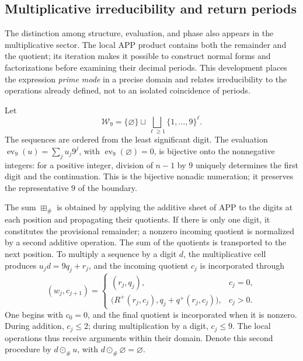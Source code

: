 \subsection{Multiplicative irreducibility and return periods}
\label{primos-retornos}

The distinction among structure, evaluation, and phase also appears in the
multiplicative sector. The local APP product contains both the remainder
and the quotient; its iteration makes it possible to construct normal forms
and factorizations before examining their decimal periods. This development
places the expression \emph{prime mode} in a precise domain and relates
irreducibility to the operations already defined, not to an isolated
coincidence of periods.

Let
\[
 \mathcal W_9=\{\varnothing\}\sqcup
 \bigsqcup_{\ell\geq1}\{1,\ldots,9\}^{\ell}.
\]
The sequences are ordered from the least significant digit. The evaluation
\(\operatorname{ev}_9(u)=\sum_j u_j9^j\), with
\(\operatorname{ev}_9(\varnothing)=0\), is bijective onto the nonnegative
integers: for a positive integer, division of \(n-1\) by \(9\)
uniquely determines the first digit and the continuation. This is the
bijective nonadic numeration; it preserves the representative \(9\) of the
boundary.

The sum \(\boxplus_\#\) is obtained by applying the additive sheet of APP to
the digits at each position and propagating their quotients. If there is only
one digit, it constitutes the provisional remainder; a nonzero incoming
quotient is normalized by a second additive operation. The sum of the
quotients is transported to the next position. To multiply a sequence by a
digit \(d\), the multiplicative cell produces \(u_jd=9q_j+r_j\), and the
incoming quotient \(c_j\) is incorporated through
\[
 (w_j,c_{j+1})=
 \begin{cases}
 (r_j,q_j),&c_j=0,\\
 \bigl(R^+(r_j,c_j),q_j+q^+(r_j,c_j)\bigr),&c_j>0.
 \end{cases}
\]
One begins with \(c_0=0\), and the final quotient is incorporated when it is
nonzero. During addition, \(c_j\leq2\); during multiplication by a digit,
\(c_j\leq9\). The local operations thus receive arguments within
their domain. Denote this second procedure by \(d\odot_\#u\),
with \(d\odot_\#\varnothing=\varnothing\).

